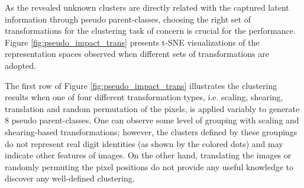\documentclass{article} \usepackage{iclr2018_conference,times}
\begin{document}
As the revealed unknown clusters are directly related with the captured latent information through pseudo parent-classes, choosing the right set of transformations for the clustering task of concern is crucial for the performance. Figure \ref{fig:pseudo_impact_trans} presents t-SNE visualizations of the representation spaces observed when different sets of transformations are adopted.

The first row of Figure \ref{fig:pseudo_impact_trans} illustrates the clustering results when one of four different transformation types, i.e. scaling, shearing, translation and random permutation of the pixels, is applied variably to generate 8 pseudo parent-classes. One can observe some level of grouping with scaling and shearing-based transformations; however, the clusters defined by these groupings do not represent real digit identities (as shown by the colored dots) and may indicate other features of images. On the other hand, translating the images or randomly permuting the pixel positions do not provide any useful knowledge to discover any well-defined clustering. 
\end{document}
